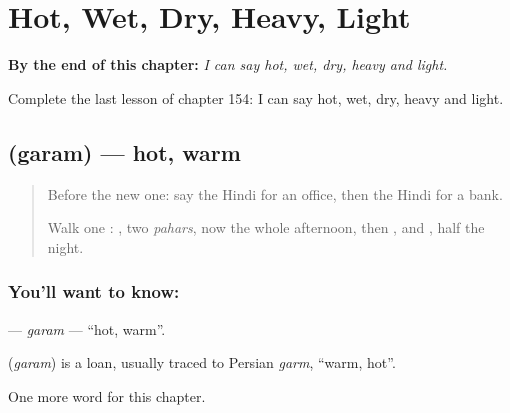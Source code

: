 
\chapter{Hot, Wet, Dry, Heavy, Light}
\label{ch:hi-hot-wet-dry-heavy-light}

\begin{chapteropening}
\textbf{By the end of this chapter:} \emph{I can say hot, wet, dry, heavy and light.}

Complete the last lesson of chapter 154: I can say hot, wet, dry, heavy and light.
\end{chapteropening}

\section[\texorpdfstring{\hi{गरम} (garam)}{गरम (garam)}]{ (garam) — hot, warm}

\label{lesson:HI-C154-garam}



\begin{quote}
Before the new one: say the Hindi for an office, then the Hindi for a bank.

Walk one \textbf{}: \textbf{}, two \emph{pahars}, now the whole afternoon, then \textbf{}, and \textbf{ }, half the night.
\end{quote}

\subsection*{You'll want to know: }
\textbf{} — \emph{garam} — \textquotedblleft{}hot, warm\textquotedblright{}.

\begin{cousinweb}
\textbf{} (\emph{garam}) is a loan, usually traced to Persian \emph{garm}, \textquotedblleft{}warm, hot\textquotedblright{}.
\end{cousinweb}

\begin{grammarlens}[title={What you've built}]
One more word for this chapter.
\end{grammarlens}

